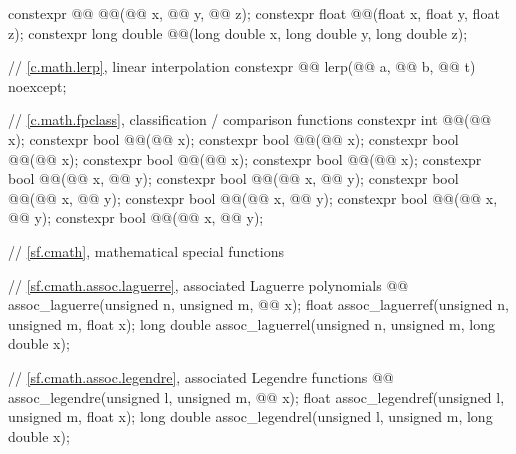 \begin{codeblock}
{  constexpr @@ @@(@@ x, @@ y,
                                    @@ z);
  constexpr float               @@(float x, float y, float z);
  constexpr long double         @@(long double x, long double y, long double z);

  // \ref{c.math.lerp}, linear interpolation
  constexpr @@ lerp(@@ a, @@ b,
                                     @@ t) noexcept;

  // \ref{c.math.fpclass}, classification / comparison functions
  constexpr int  @@(@@ x);
  constexpr bool @@(@@ x);
  constexpr bool @@(@@ x);
  constexpr bool @@(@@ x);
  constexpr bool @@(@@ x);
  constexpr bool @@(@@ x);
  constexpr bool @@(@@ x, @@ y);
  constexpr bool @@(@@ x, @@ y);
  constexpr bool @@(@@ x, @@ y);
  constexpr bool @@(@@ x, @@ y);
  constexpr bool @@(@@ x, @@ y);
  constexpr bool @@(@@ x, @@ y);

  // \ref{sf.cmath}, mathematical special functions

  // \ref{sf.cmath.assoc.laguerre}, associated Laguerre polynomials
  @@ assoc_laguerre(unsigned n, unsigned m, @@ x);
  float               assoc_laguerref(unsigned n, unsigned m, float x);
  long double         assoc_laguerrel(unsigned n, unsigned m, long double x);

  // \ref{sf.cmath.assoc.legendre}, associated Legendre functions
  @@ assoc_legendre(unsigned l, unsigned m, @@ x);
  float               assoc_legendref(unsigned l, unsigned m, float x);
  long double         assoc_legendrel(unsigned l, unsigned m, long double x);

}
\end{codeblock}
